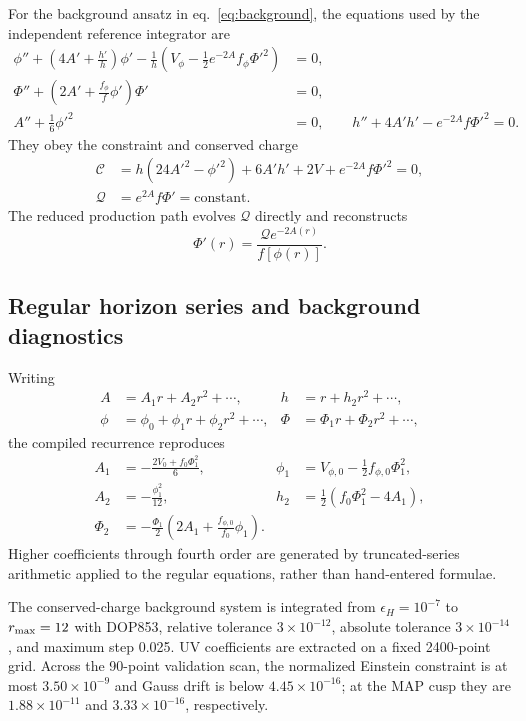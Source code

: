 \documentclass[11pt,a4paper]{article}
\begin{document}
For the background ansatz in eq.~\eqref{eq:background}, the equations used by
the independent reference integrator are
\begin{align}
 \phi''+\left(4A'+\frac{h'}h\right)\phi'
 -\frac1h\left(V_\phi-\frac12e^{-2A}f_\phi\Phi'^2\right)&=0,\nonumber\\
 \Phi''+\left(2A'+\frac{f_\phi}{f}\phi'\right)\Phi'&=0,\nonumber\\
 A''+\frac16\phi'^2&=0,\qquad
 h''+4A'h'-e^{-2A}f\Phi'^2=0.
 \label{eq:background-eoms}
\end{align}
They obey the constraint and conserved charge
\begin{align}
 \mathcal C&=h(24A'^2-\phi'^2)+6A'h'+2V+e^{-2A}f\Phi'^2=0,\nonumber\\
 \mathcal Q&=e^{2A}f\Phi'=\text{constant}.
 \label{eq:diagnostics}
\end{align}
The reduced production path evolves $\mathcal Q$ directly and reconstructs
\begin{equation}
 \Phi'(r)=\frac{\mathcal Q e^{-2A(r)}}{f[\phi(r)]}.
 \label{eq:reduced-charge}
\end{equation}

\subsection{Regular horizon series and background diagnostics}
\label{app:horizon}

Writing
\begin{align}
 A&=A_1r+A_2r^2+\cdots,&h&=r+h_2r^2+\cdots,\nonumber\\
 \phi&=\phi_0+\phi_1r+\phi_2r^2+\cdots,&
 \Phi&=\Phi_1r+\Phi_2r^2+\cdots,
\end{align}
the compiled recurrence reproduces
\begin{align}
 A_1&=-\frac{2V_0+f_0\Phi_1^2}{6},&
 \phi_1&=V_{\phi,0}-\frac12f_{\phi,0}\Phi_1^2,\nonumber\\
 A_2&=-\frac{\phi_1^2}{12},&
 h_2&=\frac12(f_0\Phi_1^2-4A_1),\nonumber\\
 \Phi_2&=-\frac{\Phi_1}{2}\left(2A_1+
 \frac{f_{\phi,0}}{f_0}\phi_1\right).
 \label{eq:horizon-series}
\end{align}
Higher coefficients through fourth order are generated by truncated-series
arithmetic applied to the regular equations, rather than hand-entered
formulae.

The conserved-charge background system is integrated from
$\epsilon_H=10^{-7}$ to $r_{\rm max}=12$ with DOP853, relative tolerance
$3\times10^{-12}$, absolute tolerance $3\times10^{-14}$, and maximum step
0.025.  UV coefficients are extracted on a fixed 2400-point grid.  Across the
90-point validation scan, the normalized Einstein constraint is at most
$3.50\times10^{-9}$ and Gauss drift is below $4.45\times10^{-16}$; at the MAP
cusp they are $1.88\times10^{-11}$ and $3.33\times10^{-16}$, respectively.
\end{document}
